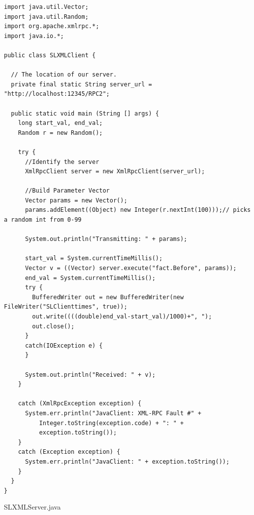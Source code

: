 \documentclass{article}
\begin{document}
\begin{lstlisting}
import java.util.Vector;
import java.util.Random;
import org.apache.xmlrpc.*;
import java.io.*;

public class SLXMLClient {

  // The location of our server.
  private final static String server_url = "http://localhost:12345/RPC2";

  public static void main (String [] args) {
    long start_val, end_val;
    Random r = new Random();

    try {
      //Identify the server
      XmlRpcClient server = new XmlRpcClient(server_url);

      //Build Parameter Vector
      Vector params = new Vector();
      params.addElement((Object) new Integer(r.nextInt(100)));// picks a random int from 0-99

      System.out.println("Transmitting: " + params);

      start_val = System.currentTimeMillis();
      Vector v = ((Vector) server.execute("fact.Before", params));
      end_val = System.currentTimeMillis();
      try {
        BufferedWriter out = new BufferedWriter(new FileWriter("SLClienttimes", true));
        out.write((((double)end_val-start_val)/1000)+", ");
        out.close();
      }
      catch(IOException e) {
      }

      System.out.println("Received: " + v);
    }

    catch (XmlRpcException exception) {
      System.err.println("JavaClient: XML-RPC Fault #" +
          Integer.toString(exception.code) + ": " +
          exception.toString());
    }
    catch (Exception exception) {
      System.err.println("JavaClient: " + exception.toString());
    }
  }
}
\end{lstlisting}

SLXMLServer.java
\end{document}

